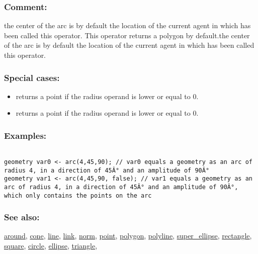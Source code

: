 \documentclass[]{book}
\providecommand{\tightlist}{%
  \setlength{\itemsep}{0pt}\setlength{\parskip}{0pt}}
\theoremstyle{definition}
\theoremstyle{definition}
\theoremstyle{definition}
\theoremstyle{remark}
\begin{document}
\subsubsection{Comment:}\label{comment-7}

the center of the arc is by default the location of the current agent in
which has been called this operator. This operator returns a polygon by
default.the center of the arc is by default the location of the current
agent in which has been called this operator.

\subsubsection{Special cases:}\label{special-cases-16}

\begin{itemize}
\tightlist
\item
  returns a point if the radius operand is lower or equal to 0.\\
\item
  returns a point if the radius operand is lower or equal to 0.
\end{itemize}

\subsubsection{Examples:}\label{examples-33}

\begin{verbatim}
 
geometry var0 <- arc(4,45,90); // var0 equals a geometry as an arc of radius 4, in a direction of 45Â° and an amplitude of 90Â° 
geometry var1 <- arc(4,45,90, false); // var1 equals a geometry as an arc of radius 4, in a direction of 45Â° and an amplitude of 90Â°, which only contains the points on the arc
\end{verbatim}

\subsubsection{See also:}\label{see-also-27}

\href{operators-a-to-a.html\#around}{around},
\href{operators-b-to-c.html\#cone}{cone},
\href{operators-i-to-m.html\#line}{line},
\href{operators-i-to-m.html\#link}{link},
\href{operators-n-to-r.html\#norm}{norm},
\href{operators-n-to-r.html\#point}{point},
\href{operators-n-to-r.html\#polygon}{polygon},
\href{operators-n-to-r.html\#polyline}{polyline},
\href{operators-s-to-z.html\#super_ellipse}{super\_ellipse},
\href{operators-n-to-r.html\#rectangle}{rectangle},
\href{operators-s-to-z.html\#square}{square},
\href{operators-b-to-c.html\#circle}{circle},
\href{operators-d-to-h.html\#ellipse}{ellipse},
\href{operators-s-to-z.html\#triangle}{triangle},
\end{document}
